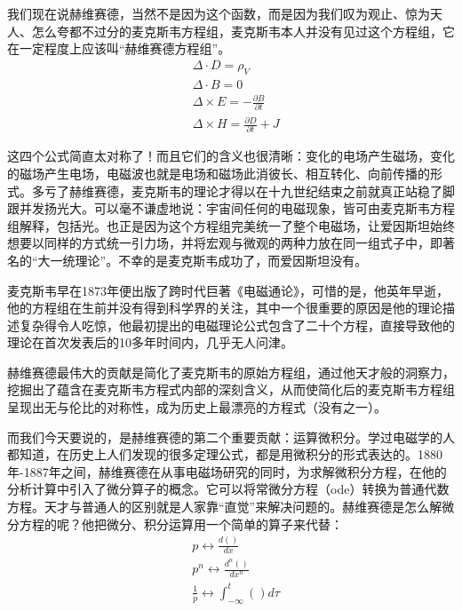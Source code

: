 \documentclass[lang=cn,11pt,a4paper,cite=numbers]{elegantpaper}
\begin{document}
  我们现在说赫维赛德，当然不是因为这个函数，而是因为我们叹为观止、惊为天人、怎么夸都不过分的麦克斯韦方程组，麦克斯韦本人并没有见过这个方程组，它在一定程度上应该叫“赫维赛德方程组”。
\begin{equation}
  \begin{aligned}
    &{\Delta}{\cdot}D=\rho_{V}\\
    &{\Delta}{\cdot}B=0\\
    &{\Delta}{\times}E=-\frac{{\partial}B}{{\partial}t}\\
    &{\Delta}{\times}H=\frac{{\partial}D}{{\partial}t}+J
  \end{aligned}
\end{equation}

  这四个公式简直太对称了！而且它们的含义也很清晰：变化的电场产生磁场，变化的磁场产生电场，电磁波也就是电场和磁场此消彼长、相互转化、向前传播的形式。多亏了赫维赛德，麦克斯韦的理论才得以在十九世纪结束之前就真正站稳了脚跟并发扬光大。可以毫不谦虚地说：宇宙间任何的电磁现象，皆可由麦克斯韦方程组解释，包括光。也正是因为这个方程组完美统一了整个电磁场，让爱因斯坦始终想要以同样的方式统一引力场，并将宏观与微观的两种力放在同一组式子中，即著名的“大一统理论”。不幸的是麦克斯韦成功了，而爱因斯坦没有。

  麦克斯韦早在1873年便出版了跨时代巨著《电磁通论》，可惜的是，他英年早逝，他的方程组在生前并没有得到科学界的关注，其中一个很重要的原因是他的理论描述复杂得令人吃惊，他最初提出的电磁理论公式包含了二十个方程，直接导致他的理论在首次发表后的10多年时间内，几乎无人问津。

  赫维赛德最伟大的贡献是简化了麦克斯韦的原始方程组，通过他天才般的洞察力，挖掘出了蕴含在麦克斯韦方程式内部的深刻含义，从而使简化后的麦克斯韦方程组呈现出无与伦比的对称性，成为历史上最漂亮的方程式（没有之一）。

  而我们今天要说的，是赫维赛德的第二个重要贡献：运算微积分。学过电磁学的人都知道，在历史上人们发现的很多定理公式，都是用微积分的形式表达的。1880年-1887年之间，赫维赛德在从事电磁场研究的同时，为求解微积分方程，在他的分析计算中引入了微分算子的概念。它可以将常微分方程（ode）转换为普通代数方程。天才与普通人的区别就是人家靠“直觉”来解决问题的。赫维赛德是怎么解微分方程的呢？他把微分、积分运算用一个简单的算子来代替：
\begin{equation}
  \begin{aligned}
    &p{\leftrightarrow}\frac{d()}{dx}\\
    &p^{n}{\leftrightarrow}\frac{d^{n}()}{dx^{n}}\\
    &\frac{1}{p}{\leftrightarrow}\int_{-\infty}^{t}()d{\tau}
  \end{aligned}
\end{equation}
\end{document}
